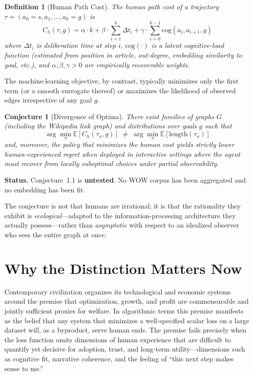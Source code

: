 \documentclass[11pt,a4paper]{report}
\newtheorem{conjecture}{Conjecture}[chapter]
\newtheorem{definition}{Definition}[chapter]
\begin{document}
\begin{definition}[Human Path Cost]
The human path cost of a trajectory \(\tau = (a_0 = s, a_1, \dots, a_k = g)\) is
\[
C_h(\tau, g) = \alpha \cdot k + \beta \cdot \sum_{i=1}^k \Delta t_i + \gamma \cdot \sum_{i=0}^{k-1} \text{cog}(a_i, a_{i+1}, g)
\]
where \(\Delta t_i\) is deliberation time at step \(i\), \(\text{cog}(\cdot)\) is a latent cognitive-load function (estimated from position in article, out-degree, embedding similarity to goal, etc.), and \(\alpha, \beta, \gamma > 0\) are empirically recoverable weights.
\end{definition}

The machine-learning objective, by contrast, typically minimizes only the first term (or a smooth surrogate thereof) or maximizes the likelihood of observed edges irrespective of any goal \(g\).

\begin{conjecture}[Divergence of Optima]
There exist families of graphs \(G\) (including the Wikipedia link graph) and distributions over goals \(g\) such that
\[
\arg\min_{\pi} \mathbb{E}[C_h(\tau_\pi, g)] \;\neq\; \arg\min_{\pi} \mathbb{E}[\text{length}(\tau_\pi)]
\]
and, moreover, the policy that minimizes the human cost yields strictly lower \textit{human-experienced regret} when deployed in interactive settings where the agent must recover from locally suboptimal choices under partial observability.
\end{conjecture}

\noindent\textbf{Status.} Conjecture~1.1 is \textbf{untested}. No WOW corpus has been aggregated and no embedding has been fit.

The conjecture is not that humans are irrational; it is that the rationality they exhibit is \textit{ecological}—adapted to the information-processing architecture they actually possess—rather than \textit{asymptotic} with respect to an idealized observer who sees the entire graph at once.

\section{Why the Distinction Matters Now}

Contemporary civilization organizes its technological and economic systems around the premise that optimization, growth, and profit are commensurable and jointly sufficient proxies for welfare. In algorithmic terms this premise manifests as the belief that any system that minimizes a well-specified scalar loss on a large dataset will, as a byproduct, serve human ends. The premise fails precisely when the loss function omits dimensions of human experience that are difficult to quantify yet decisive for adoption, trust, and long-term utility—dimensions such as cognitive fit, narrative coherence, and the feeling of “this next step makes sense to me.”
\end{document}
